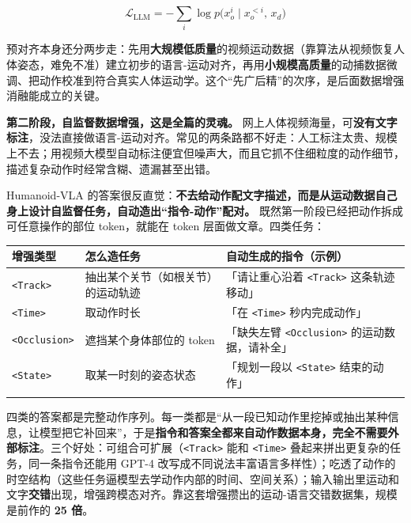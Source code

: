 \documentclass[
  chinese,
]{ctexart}
\begin{document}
\[\mathcal{L}_\text{LLM} = -\sum_{i} \log p\big(x_o^i \mid x_o^{<i},\, x_d\big)\]

预对齐本身还分两步走：先用\textbf{大规模低质量}的视频运动数据（靠算法从视频恢复人体姿态，难免不准）建立初步的语言-运动对齐，再用\textbf{小规模高质量}的动捕数据微调、把动作校准到符合真实人体运动学。这个``先广后精''的次序，是后面数据增强消融能成立的关键。

\textbf{第二阶段，自监督数据增强，这是全篇的灵魂。}
网上人体视频海量，可\textbf{没有文字标注}，没法直接做语言-运动对齐。常见的两条路都不好走：人工标注太贵、规模上不去；用视频大模型自动标注便宜但噪声大，而且它抓不住细粒度的动作细节，描述复杂动作时经常含糊、遗漏甚至出错。

Humanoid-VLA
的答案很反直觉：\textbf{不去给动作配文字描述，而是从运动数据自己身上设计自监督任务，自动造出``指令-动作''配对。}
既然第一阶段已经把动作拆成可任意操作的部位 token，就能在 token
层面做文章。四类任务：

\begin{center}
\begin{tabular}{@{}>{\raggedright\arraybackslash}p{} >{\raggedright\arraybackslash}p{} >{\raggedright\arraybackslash}p{}@{}}
\toprule\noalign{}
增强类型 & 怎么造任务 & 自动生成的指令（示例） \\
\midrule\noalign{}
\texttt{\textless{}Track\textgreater{}} & 抽出某个关节（如根关节）的运动轨迹 & 「请让重心沿着 \texttt{\textless{}Track\textgreater{}} 这条轨迹移动」 \\
\texttt{\textless{}Time\textgreater{}} & 取动作时长 & 「在 \texttt{\textless{}Time\textgreater{}} 秒内完成动作」 \\
\texttt{\textless{}Occlusion\textgreater{}} & 遮挡某个身体部位的 token & 「缺失左臂 \texttt{\textless{}Occlusion\textgreater{}} 的运动数据，请补全」 \\
\texttt{\textless{}State\textgreater{}} & 取某一时刻的姿态状态 & 「规划一段以 \texttt{\textless{}State\textgreater{}} 结束的动作」 \\
\bottomrule\noalign{}
\end{tabular}
\end{center}

四类的答案都是完整动作序列。每一类都是``从一段已知动作里挖掉或抽出某种信息，让模型把它补回来''，于是\textbf{指令和答案全都来自动作数据本身，完全不需要外部标注}。三个好处：可组合可扩展（\texttt{\textless{}Track\textgreater{}}
能和 \texttt{\textless{}Time\textgreater{}}
叠起来拼出更复杂的任务，同一条指令还能用 GPT-4
改写成不同说法丰富语言多样性）；吃透了动作的时空结构（这些任务逼模型去学动作内部的时间、空间关系）；输入输出里运动和文字\textbf{交错}出现，增强跨模态对齐。靠这套增强攒出的运动-语言交错数据集，规模是前作的
\textbf{25 倍}。
\end{document}
